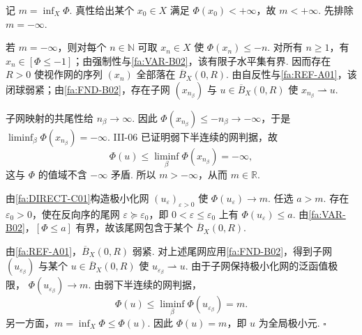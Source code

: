 \begin{FAProof}
记 \(\displaystyle m=\inf_X\Phi\). 真性给出某个 \(\displaystyle x_0\in X\) 满足 \(\displaystyle\Phi(x_0)<+\infty\)，故 \(\displaystyle m<+\infty\). 先排除 \(\displaystyle m=-\infty\).

若 \(\displaystyle m=-\infty\)，则对每个 \(\displaystyle n\in\mathbb N\) 可取 \(\displaystyle x_n\in X\) 使 \(\displaystyle\Phi(x_n)\leqslant-n\). 对所有 \(\displaystyle n\geqslant1\)，有 \(\displaystyle x_n\in[\Phi\leqslant-1]\)；由强制性与\autoref{fa:VAR-B02}，该有限子水平集有界. 因而存在 \(\displaystyle R>0\) 使视作网的序列 \(\displaystyle(x_n)\) 全部落在 \(\displaystyle\overline B_X(0,R)\). 由自反性与\autoref{fa:REF-A01}，该闭球弱紧；由\autoref{fa:FND-B02}，存在子网 \(\displaystyle(x_{n_\beta})\) 与 \(\displaystyle u\in\overline B_X(0,R)\) 使 \(\displaystyle x_{n_\beta}\rightharpoonup u\).

子网映射的共尾性给 \(\displaystyle n_\beta\to\infty\). 因此 \(\displaystyle\Phi(x_{n_\beta})\leqslant-n_\beta\to-\infty\)，于是
\(\displaystyle \liminf_\beta\Phi(x_{n_\beta})=-\infty\).
III-06 已证明弱下半连续的网判据，故
\[
\Phi(u)
\leqslant
\liminf_\beta\Phi(x_{n_\beta})
=
-\infty,
\]
这与 \(\displaystyle\Phi\) 的值域不含 \(\displaystyle-\infty\) 矛盾. 所以 \(\displaystyle m> -\infty\)，从而 \(\displaystyle m\in\mathbb R\).

由\autoref{fa:DIRECT-C01}构造极小化网 \(\displaystyle(u_\varepsilon)_{\varepsilon>0}\) 使 \(\displaystyle\Phi(u_\varepsilon)\to m\). 任选 \(\displaystyle a>m\). 存在 \(\displaystyle\varepsilon_0>0\)，使在反向序的尾网 \(\displaystyle\varepsilon\succeq\varepsilon_0\)，即 \(\displaystyle0<\varepsilon\leqslant\varepsilon_0\) 上有 \(\displaystyle\Phi(u_\varepsilon)\leqslant a\). 由\autoref{fa:VAR-B02}，\(\displaystyle[\Phi\leqslant a]\) 有界，故该尾网包含于某个 \(\displaystyle\overline B_X(0,R)\).

由\autoref{fa:REF-A01}，\(\displaystyle\overline B_X(0,R)\) 弱紧. 对上述尾网应用\autoref{fa:FND-B02}，得到子网 \(\displaystyle(u_{\varepsilon_\beta})\) 与某个 \(\displaystyle u\in\overline B_X(0,R)\) 使 \(\displaystyle u_{\varepsilon_\beta}\rightharpoonup u\). 由于子网保持极小化网的泛函值极限，
\(\displaystyle \Phi(u_{\varepsilon_\beta}) \longrightarrow m\).
由弱下半连续的网判据，
\[
\Phi(u)
\leqslant
\liminf_\beta\Phi(u_{\varepsilon_\beta})
=
m.
\]
另一方面，\(\displaystyle m=\inf_X\Phi\leqslant\Phi(u)\). 因此 \(\displaystyle\Phi(u)=m\)，即 \(\displaystyle u\) 为全局极小元.
\hfill\(\square\)
\end{FAProof}

